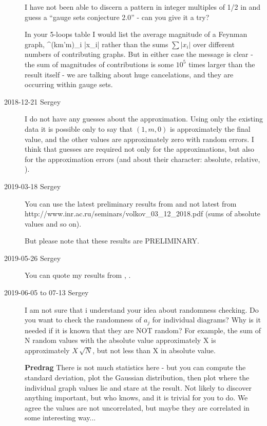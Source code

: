 \begin{description}
I have not been able to discern a pattern in integer multiples of 1/2 in
 and guess a ``gauge sets conjecture 2.0'' - can you
give it a try?

In your 5-loops table I would list the average magnitude of a Feynman graph,
\beq
{} \sum^{({km'm})}_i |x_i|
rather than the sums $\sum |x_i|$ over different numbers of contributing
graphs. But in either case the message is clear - the sum of magnitudes
of contributions is some $10^5$ times larger than the result itself - we
are talking about huge cancelations, and they are occurring within gauge
sets.

\item[2018-12-21 Sergey]
I do not have any guesses about the approximation. Using only the
existing data it is possible only to say that $(1,m,0)$ is
approximately the final value, and the other values are approximately
zero with random errors. I think that guesses are required not only for
the approximations, but also for the approximation errors (and about
their character: absolute, relative, \etc).

\item[2019-03-18 Sergey]
You can use the latest preliminary results from
and not latest from
{http://www.inr.ac.ru/seminars/volkov\_03\_12\_2018.pdf}
(sums of absolute values and so on).

But please note that these results are PRELIMINARY.

\item[2019-05-26 Sergey]
You can quote my results from , .

\item[2019-06-05 to 07-13 Sergey]
    I am not sure that i understand your idea about randomness checking.
    Do you want to check the randomness of $a_j$ for individual diagrams?
    Why is it needed if it is known that they are NOT random? For
    example, the sum of N random values with the absolute value
    approximately X is approximately $X\,\sqrt{N}$, but not less than X
    in absolute value.


{\bf Predrag} There is not much statistics here -  but you can compute
the standard deviation, plot the Gaussian distribution, then plot where
the individual graph values lie and stare at the result. Not likely to
discover anything important, but who knows, and it is trivial for you to
do. We agree the values are not uncorrelated, but maybe they are
correlated in some interesting way...


\end{description}
